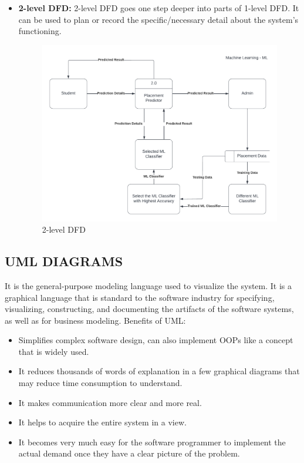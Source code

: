 \documentclass[12pt]{article}
\begin{document}
\begin{itemize}
\item \textbf{2-level DFD: }
2-level DFD goes one step deeper into parts of 1-level DFD. It can be used to plan or record the specific/necessary detail about the system’s functioning. 

\begin{figure}[H]
\begin{center}
\includegraphics[scale=.8]{2- LEVEL DFD}
\caption{2-level DFD}
\end{center}
\end{figure}

\end{itemize}

\subsection{UML DIAGRAMS}

It is the general-purpose modeling language used to visualize the system. It is a graphical language that is standard to the software industry for specifying, visualizing, constructing, and documenting the artifacts of the software systems, as well as for business modeling.
Benefits of UML: 
\begin{itemize}
\item Simplifies complex software design, can also implement OOPs like a concept that is widely used.
\item It reduces thousands of words of explanation in a few graphical diagrams that may reduce time consumption to understand.
\item It makes communication more clear and more real.
\item It helps to acquire the entire system in a view.
\item It becomes very much easy for the software programmer to implement the actual demand once they have a clear picture of the problem.
\end{itemize}
\end{document}
